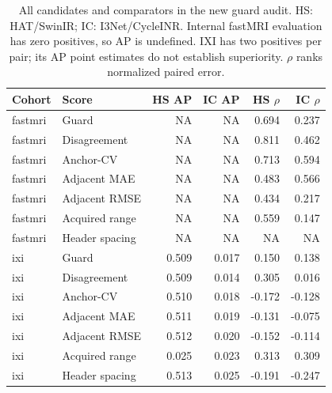 \begin{table}[t]\centering\small
\caption{All candidates and comparators in the new guard audit. HS: HAT/SwinIR; IC: I3Net/CycleINR. Internal fastMRI evaluation has zero positives, so AP is undefined. IXI has two positives per pair; its AP point estimates do not establish superiority. $\rho$ ranks normalized paired error.}
\begin{tabular}{llrrrr}\toprule
Cohort & Score & HS AP & IC AP & HS $\rho$ & IC $\rho$\\\midrule
fastmri & Guard & NA & NA & 0.694 & 0.237\\
fastmri & Disagreement & NA & NA & 0.811 & 0.462\\
fastmri & Anchor-CV & NA & NA & 0.713 & 0.594\\
fastmri & Adjacent MAE & NA & NA & 0.483 & 0.566\\
fastmri & Adjacent RMSE & NA & NA & 0.434 & 0.217\\
fastmri & Acquired range & NA & NA & 0.559 & 0.147\\
fastmri & Header spacing & NA & NA & NA & NA\\
ixi & Guard & 0.509 & 0.017 & 0.150 & 0.138\\
ixi & Disagreement & 0.509 & 0.014 & 0.305 & 0.016\\
ixi & Anchor-CV & 0.510 & 0.018 & -0.172 & -0.128\\
ixi & Adjacent MAE & 0.511 & 0.019 & -0.131 & -0.075\\
ixi & Adjacent RMSE & 0.512 & 0.020 & -0.152 & -0.114\\
ixi & Acquired range & 0.025 & 0.023 & 0.313 & 0.309\\
ixi & Header spacing & 0.513 & 0.025 & -0.191 & -0.247\\
\bottomrule\end{tabular}\end{table}